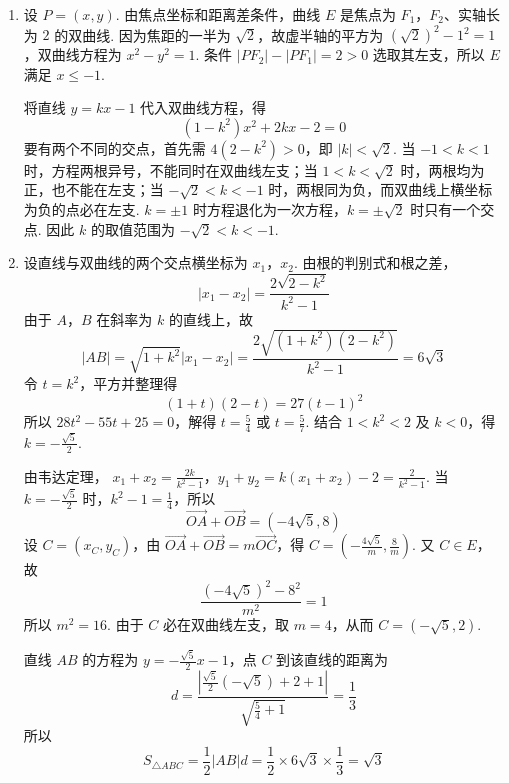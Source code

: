\begin{solution}
\begin{enumerate}
\item 设 \(P=(x,y)\). 由焦点坐标和距离差条件，曲线 \(E\) 是焦点为 \(F_1\)，\(F_2\)、实轴长为 \(2\) 的双曲线. 因为焦距的一半为 \(\sqrt{2}\)，故虚半轴的平方为 \(\left(\sqrt{2}\right)^2-1^2=1\)，双曲线方程为 \(x^2-y^2=1\). 条件 \(\lvert PF_2\rvert-\lvert PF_1\rvert=2>0\) 选取其左支，所以 \(E\) 满足 \(x\leqslant-1\).

将直线 \(y=kx-1\) 代入双曲线方程，得
\[
(1-k^2)x^2+2kx-2=0
\]
要有两个不同的交点，首先需 \(4(2-k^2)>0\)，即 \(\lvert k\rvert<\sqrt{2}\). 当 \(-1<k<1\) 时，方程两根异号，不能同时在双曲线左支；当 \(1<k<\sqrt{2}\) 时，两根均为正，也不能在左支；当 \(-\sqrt{2}<k<-1\) 时，两根同为负，而双曲线上横坐标为负的点必在左支. \(k=\pm1\) 时方程退化为一次方程，\(k=\pm\sqrt{2}\) 时只有一个交点. 因此 \(k\) 的取值范围为 \(-\sqrt{2}<k<-1\).

\item 设直线与双曲线的两个交点横坐标为 \(x_1\)，\(x_2\). 由根的判别式和根之差，
\[
\lvert x_1-x_2\rvert=\frac{2\sqrt{2-k^2}}{k^2-1}
\]
由于 \(A\)，\(B\) 在斜率为 \(k\) 的直线上，故
\[
\lvert AB\rvert=\sqrt{1+k^2}\lvert x_1-x_2\rvert=\frac{2\sqrt{(1+k^2)(2-k^2)}}{k^2-1}=6\sqrt{3}
\]
令 \(t=k^2\)，平方并整理得
\[
(1+t)(2-t)=27(t-1)^2
\]
所以 \(28t^2-55t+25=0\)，解得 \(t=\frac{5}{4}\) 或 \(t=\frac{5}{7}\). 结合 \(1<k^2<2\) 及 \(k<0\)，得 \(k=-\frac{\sqrt{5}}{2}\).

由韦达定理，
\(x_1+x_2=\frac{2k}{k^2-1}\)，\(y_1+y_2=k(x_1+x_2)-2=\frac{2}{k^2-1}\).
当 \(k=-\frac{\sqrt{5}}{2}\) 时，\(k^2-1=\frac14\)，所以
\[
\overrightarrow{OA}+\overrightarrow{OB}=(-4\sqrt{5},8)
\]
设 \(C=(x_C,y_C)\)，由 \(\overrightarrow{OA}+\overrightarrow{OB}=m\overrightarrow{OC}\)，得 \(C=\left(-\frac{4\sqrt{5}}{m},\frac{8}{m}\right)\). 又 \(C\in E\)，故
\[
\frac{(-4\sqrt{5})^2-8^2}{m^2}=1
\]
所以 \(m^2=16\).
由于 \(C\) 必在双曲线左支，取 \(m=4\)，从而 \(C=(-\sqrt{5},2)\).

直线 \(AB\) 的方程为 \(y=-\frac{\sqrt{5}}{2}x-1\)，点 \(C\) 到该直线的距离为
\[
d=\frac{\left\lvert\frac{\sqrt{5}}{2}(-\sqrt{5})+2+1\right\rvert}{\sqrt{\frac54+1}}=\frac13
\]
所以
\[
S_{\triangle ABC}=\frac12\lvert AB\rvert d=\frac12\times6\sqrt{3}\times\frac13=\sqrt{3}
\]
\end{enumerate}
\end{solution}
